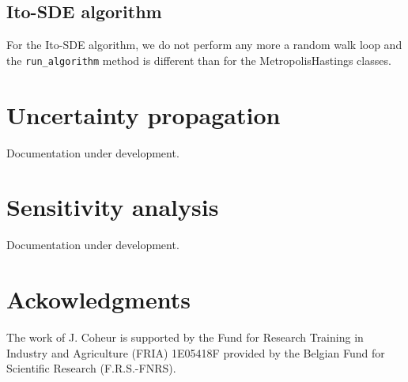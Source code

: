 \documentclass[a4paper,11pt]{article}
\begin{document}
\subsection{Ito-SDE algorithm}

For the Ito-SDE algorithm, we do not perform any more a random walk loop and the \texttt{run\_algorithm} method is different than for the MetropolisHastings classes. 



\section{Uncertainty propagation} 

Documentation under development. 

\section{Sensitivity analysis} 

Documentation under development. 


\section{Ackowledgments} 
The work of J. Coheur is supported by the Fund for Research Training in Industry and Agriculture (FRIA) 1E05418F provided by the Belgian Fund for Scientific Research (F.R.S.-FNRS).

 

\end{document}
